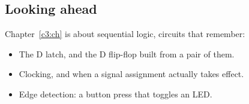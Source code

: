 \subsection*{Looking ahead}
Chapter~\ref{c3:ch} is about sequential logic, circuits that remember:
\begin{itemize}
  \item The D latch, and the D flip-flop built from a pair of them.
  \item Clocking, and when a signal assignment actually takes effect.
  \item Edge detection: a button press that toggles an LED.
\end{itemize}
